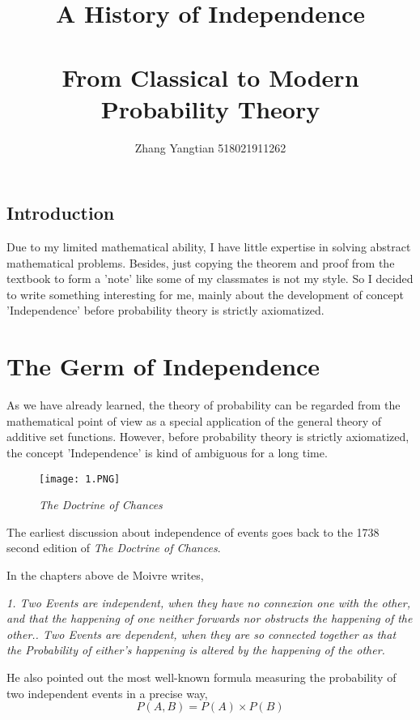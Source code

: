 \documentclass{article}
\title{A History of Independence\\
\\[0.5em]\large From Classical to Modern Probability Theory}
\author{Zhang Yangtian 518021911262}
\date{}
\begin{document}
    \maketitle
\begin{tcolorbox}
\section*{Introduction}
Due to my limited mathematical ability, I have little expertise in solving abstract mathematical problems. Besides, just copying the theorem and proof from the textbook to form a 'note' like some of my classmates is not my style. So I decided to write something interesting for me, mainly about the development of concept 'Independence' before probability theory is strictly axiomatized.
\end{tcolorbox}

\section{The Germ of Independence}
As we have already learned,  the theory of probability can be regarded from the mathematical point of view as a special application of the general theory of additive set functions. However, before probability theory is strictly axiomatized, the concept 'Independence' is kind of ambiguous for a long time. 
\begin{figure}[h]
    \centering
    \texttt{[image: 1.PNG]}
    \caption{\textit{The Doctrine of Chances}}
    \label{fig:my_label}
\end{figure}

The earliest discussion about independence of events goes back to the 1738 second edition of \textit{The Doctrine of Chances}\cite{doctrine}.

In the chapters above de Moivre writes, 

\begin{tcolorbox}[colback=black!0!white,colframe=red!75!black]
\slshape
1. Two Events are independent, when they have no connexion one with the other, and that the happening of one neither forwards nor obstructs the happening of the other.. Two Events are dependent, when they are so connected together as that the Probability of either's happening is altered by the happening of the other.
\end{tcolorbox}

He also pointed out the most well-known formula measuring the probability of two independent events in a precise way,
\begin{equation*}
P(A,B) = P(A)\times P(B)
\end{equation*}
\end{document}

